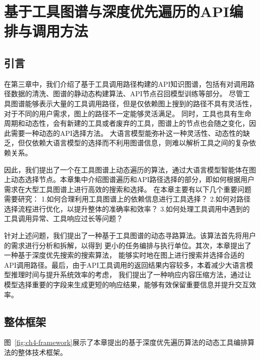 \chapter{基于工具图谱与深度优先遍历的API编排与调用方法}

\section{引言}
\label{sec:intro}

\indent 在第三章中，我们介绍了基于工具调用路径构建的API知识图谱，包括有对调用路径数据的清洗、图谱的静动态构建算法、API节点召回模型训练等部分。
尽管工具图谱能够表示大量的工具调用路径，但是仅依赖图上搜到的路径不具有灵活性，对于不同的用户需求，图上的路径不一定能够灵活满足。
同时，工具也具有生命周期和动态性，会有新建的工具或者废弃的工具，图谱上的节点也会随之变化，因此需要一种动态的API选择方法。
大语言模型能弥补这一种灵活性、动态性的缺乏，但仅依赖大语言模型的选择而不利用图谱信息，则难以解析工具之间的复杂依赖关系。

因此，我们提出了一个在工具图谱上动态遍历的算法，通过大语言模型智能体在图上动态选择节点。本章集中介绍图谱遍历和API路径选择的部分，即如何根据用户需求在大型工具图谱上进行高效的搜索和选择。
在本章主要有以下几个重要问题需要研究：
1.如何合理利用工具图谱上的依赖信息进行工具选择？
2.如何对路径选择流程进行优化，以提升整体的准确率和效率？
3.如何处理工具调用中遇到的工具调用异常、工具响应过长等问题？

\indent 针对上述问题，我们提出了一种基于工具图谱的动态寻路算法。该算法首先将用户的需求进行分析和拆解，以得到
更小的任务编排与执行单位。其次，本章提出了一种基于深度优先搜索的搜索算法，
能够实时地在图上进行搜索并选择合适的API调用路径。最后，由于API工具调用的返回结果内容较多，本着减少大语言模型推理时间与提升系统效率的考虑，
我们提出了一种响应内容压缩方法，通过让模型选择重要的字段来生成更短的响应结果，能够有效保留重要信息并提升交互效率。

\section{整体框架}

图~\ref{fig:ch4-framework}展示了本章提出的基于深度优先遍历算法的动态工具编排算法的整体技术框架。

